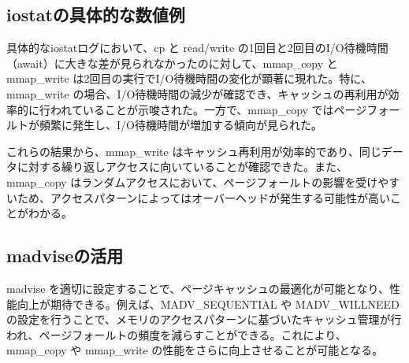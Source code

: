 \documentclass[a4paper, 11pt, titlepage]{jsarticle}
\begin{document}
\subsection{iostatの具体的な数値例}

具体的なiostatログにおいて、cp と read/write の1回目と2回目のI/O待機時間（await）に大きな差が見られなかったのに対して、mmap\_copy と mmap\_write は2回目の実行でI/O待機時間の変化が顕著に現れた。特に、mmap\_write の場合、I/O待機時間の減少が確認でき、キャッシュの再利用が効率的に行われていることが示唆された。一方で、mmap\_copy ではページフォールトが頻繁に発生し、I/O待機時間が増加する傾向が見られた。

これらの結果から、mmap\_write はキャッシュ再利用が効率的であり、同じデータに対する繰り返しアクセスに向いていることが確認できた。また、mmap\_copy はランダムアクセスにおいて、ページフォールトの影響を受けやすいため、アクセスパターンによってはオーバーヘッドが発生する可能性が高いことがわかる。

\subsection{madviseの活用}

madvise を適切に設定することで、ページキャッシュの最適化が可能となり、性能向上が期待できる。例えば、MADV\_SEQUENTIAL や MADV\_WILLNEED の設定を行うことで、メモリのアクセスパターンに基づいたキャッシュ管理が行われ、ページフォールトの頻度を減らすことができる。これにより、mmap\_copy や mmap\_write の性能をさらに向上させることが可能となる。
\end{document}
